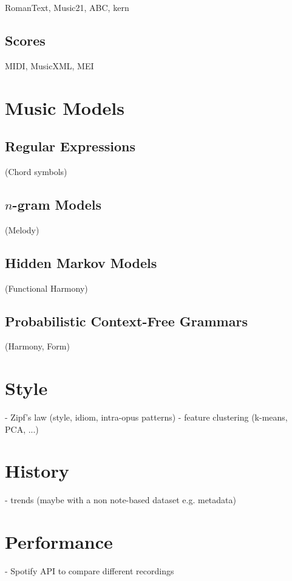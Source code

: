 \documentclass{book}
\begin{document}
RomanText, Music21, ABC, \*\*kern

\section{Scores}

MIDI, MusicXML, MEI

\chapter{Music Models}

\section{Regular Expressions}

(Chord symbols)

\section{$n$-gram Models}

(Melody)

\section{Hidden Markov Models}

(Functional Harmony)

\section{Probabilistic Context-Free Grammars}

(Harmony, Form)

\chapter{Style}

- Zipf's law (style, idiom, intra-opus patterns) \citep{Meyer1989}
- feature clustering (k-means, PCA, ...)

\chapter{History}

- trends (maybe with a non note-based dataset e.g. metadata)

\chapter{Performance}

- Spotify API to compare different recordings



\printbibliography
\end{document}
